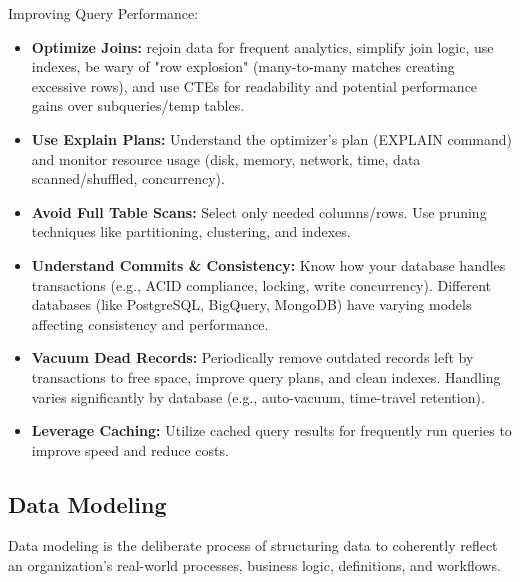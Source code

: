 Improving Query Performance:
\begin{itemize}
    \item \textbf{Optimize Joins:} rejoin data for frequent
    analytics, simplify join logic, use indexes, be wary of
    "row explosion" (many-to-many matches creating excessive
    rows), and use CTEs for readability and potential
    performance gains over subqueries/temp tables.
    
    \item \textbf{Use Explain Plans:} Understand the
    optimizer's plan (EXPLAIN command) and monitor resource
    usage (disk, memory, network, time, data scanned/shuffled,
    concurrency).

    \item \textbf{Avoid Full Table Scans:} Select only needed
    columns/rows. Use pruning techniques like partitioning,
    clustering, and indexes.

    \item \textbf{Understand Commits & Consistency:} Know how
    your database handles transactions (e.g., ACID compliance,
    locking, write concurrency). Different databases (like
    PostgreSQL, BigQuery, MongoDB) have varying models
    affecting consistency and performance.

    \item \textbf{Vacuum Dead Records:} Periodically remove
    outdated records left by transactions to free space,
    improve query plans, and clean indexes. Handling varies
    significantly by database (e.g., auto-vacuum, time-travel
    retention).
 
    \item \textbf{Leverage Caching:} Utilize cached query
    results for frequently run queries to improve speed and
    reduce costs.
\end{itemize}












\subsection{Data Modeling}
Data modeling is the deliberate process of structuring data
to coherently reflect an organization's real-world processes,
business logic, definitions, and workflows.

